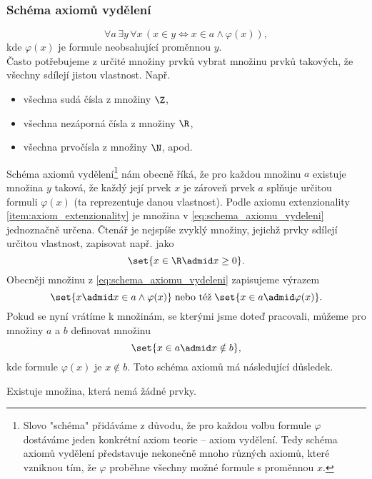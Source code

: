 \subsubsection{Schéma axiomů vydělení}
\begin{equation}\label{eq:schema_axiomu_vydeleni}
    \forall a\,\exists y\,\forall x\,(x\in y \iff x\in a \land \varphi(x)),
\end{equation}
kde $\varphi(x)$ je formule neobsahující proměnnou $y$.\\
Často potřebujeme z určité množiny prvků vybrat množinu prvků takových, že všechny sdílejí jistou vlastnost. Např.
\begin{itemize}
    \item všechna sudá čísla z množiny $\Z$,
    \item všechna nezáporná čísla z množiny $\R$,
    \item všechna prvočísla z množiny $\N$, apod.
\end{itemize}
Schéma axiomů vydělení\footnote{Slovo "schéma" přidáváme z důvodu, že pro každou volbu formule $\varphi$ dostáváme jeden konkrétní axiom teorie -- axiom vydělení. Tedy schéma axiomů vydělení představuje nekonečně mnoho různých axiomů, které vzniknou tím, že $\varphi$ proběhne všechny možné formule s proměnnou $x$.} nám obecně říká, že pro každou množinu $a$ existuje množina $y$ taková, že každý její prvek $x$ je zároveň prvek $a$ splňuje určitou formuli $\varphi(x)$ (ta reprezentuje danou vlastnost). Podle axiomu extenzionality \ref{item:axiom_extenzionality} je množina v \eqref{eq:schema_axiomu_vydeleni} jednoznačně určena. Čtenář je nejspíše zvyklý množiny, jejichž prvky sdílejí určitou vlastnost, zapisovat např. jako
\begin{equation*}
    \set{x\in\R \admid x\geq 0}.
\end{equation*}
Obecněji množinu z \eqref{eq:schema_axiomu_vydeleni} zapisujeme výrazem
\begin{equation*}
    \set{x \admid x\in a \land \varphi(x)}\;\text{nebo též}\;\set{x\in a\admid \varphi(x)}.
\end{equation*}
Pokud se nyní vrátíme k množinám, se kterými jsme doteď pracovali, můžeme pro množiny $a$ a $b$ definovat množinu
\begin{equation*}
    \set{x\in a\admid x\notin b},
\end{equation*}
kde formule $\varphi(x)$ je $x\notin b$. Toto schéma axiomů má následující důsledek.
\begin{corollary}
    Existuje množina, která nemá žádné prvky.
\end{corollary}
